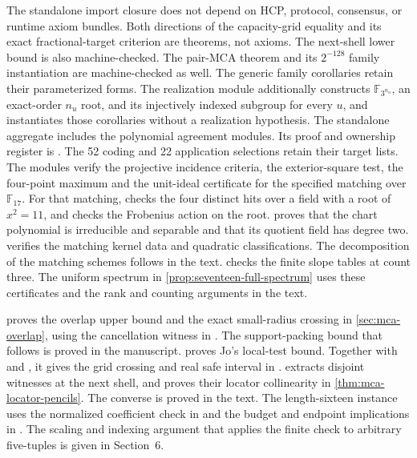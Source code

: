 The standalone import closure does not depend on HCP, protocol, consensus, or
runtime axiom bundles.
Both directions of the capacity-grid equality and its exact fractional-target
criterion are theorems, not axioms.  The next-shell lower bound is also
machine-checked.  The pair-MCA theorem and its \(2^{-128}\) family
instantiation are machine-checked as well.
The generic family corollaries retain their parameterized forms. The
realization module additionally constructs \(\mathbb F_{3^{n_u}}\), an
exact-order \(n_u\) root, and its injectively indexed subgroup for every
\(u\), and instantiates those corollaries without a realization hypothesis.
The standalone aggregate  includes the
polynomial agreement modules. Its proof and ownership register is
. The 52 coding and 22 application
selections retain their target lists.
The  modules verify the projective incidence
criteria, the exterior-square test, the four-point maximum and the
unit-ideal certificate for the specified matching over \(\mathbb F_{17}\).
For that matching,  checks the four distinct hits
over a field with a root of \(x^2=11\), and checks the Frobenius action on
the root.  proves that the chart polynomial
is irreducible and separable and that its quotient field has degree two.
 verifies the matching kernel data and
quadratic classifications. The decomposition of the matching schemes
follows in the text.  checks the finite slope
tables at count three. The uniform spectrum in \cref{prop:seventeen-full-spectrum}
uses these certificates and the rank and counting arguments in the text.

 proves the overlap upper bound and the exact
small-radius crossing in \cref{sec:mca-overlap}, using the cancellation
witness in . The support-packing bound
that follows is proved in the manuscript.
 proves Jo's local-test bound. Together with
 and , it gives the grid
crossing and real safe interval in .
 extracts disjoint witnesses at the next shell,
and  proves their locator collinearity in
\cref{thm:mca-locator-pencils}. The converse is proved in the text.
The length-sixteen instance uses the normalized coefficient check in
 and the budget and endpoint implications in
. The scaling and indexing argument that
applies the finite check to arbitrary five-tuples is given in Section~6.

